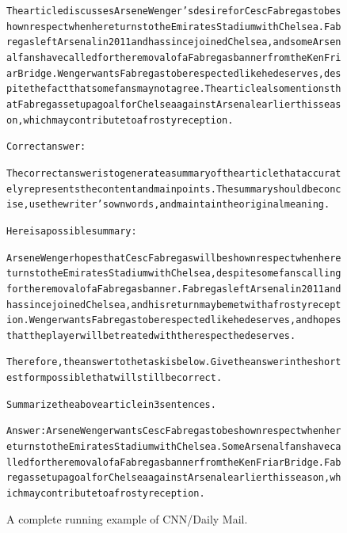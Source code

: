 \begin{figure}[t]
{{\begin{alltt}
The article discusses Arsene Wenger's desire for Cesc Fabregas to be shown respect when he returns to the Emirates Stadium with Chelsea. Fabregas left Arsenal in 2011 and has since joined Chelsea, and some Arsenal fans have called for the removal of a Fabregas banner from the Ken Friar Bridge. Wenger wants Fabregas to be respected like he deserves, despite the fact that some fans may not agree. The article also mentions that Fabregas set up a goal for Chelsea against Arsenal earlier this season, which may contribute to a frosty reception.

Correct answer:

The correct answer is to generate a summary of the article that accurately represents the content and main points. The summary should be concise, use the writer's own words, and maintain the original meaning.

Here is a possible summary:

Arsene Wenger hopes that Cesc Fabregas will be shown respect when he returns to the Emirates Stadium with Chelsea, despite some fans calling for the removal of a Fabregas banner. Fabregas left Arsenal in 2011 and has since joined Chelsea, and his return may be met with a frosty reception. Wenger wants Fabregas to be respected like he deserves, and hopes that the player will be treated with the respect he deserves.

Therefore, the answer to the task is below. Give the answer in the shortest form possible that will still be correct.

Summarize the above article in 3 sentences.

Answer: Arsene Wenger wants Cesc Fabregas to be shown respect when he returns to the Emirates Stadium with Chelsea. Some Arsenal fans have called for the removal of a Fabregas banner from the Ken Friar Bridge. Fabregas set up a goal for Chelsea against Arsenal earlier this season, which may contribute to a frosty reception.

\end{alltt}
}}
\caption{A complete running example of CNN/Daily Mail.}
\label{fig:summarization_cnndm}
\end{figure}
